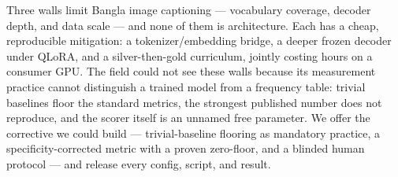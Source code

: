 \documentclass[11pt]{article}
\begin{document}
Three walls limit Bangla image captioning --- vocabulary coverage,
decoder depth, and data scale --- and none of them is architecture.
Each has a cheap, reproducible mitigation: a tokenizer/embedding
bridge, a deeper frozen decoder under QLoRA, and a silver-then-gold
curriculum, jointly costing hours on a consumer GPU. The field could
not see these walls because its measurement practice cannot
distinguish a trained model from a frequency table: trivial baselines
floor the standard metrics, the strongest published number does not
reproduce, and the scorer itself is an unnamed free parameter. We
offer the corrective we could build --- trivial-baseline flooring as
mandatory practice, a specificity-corrected metric with a proven
zero-floor, and a blinded human protocol --- and release every
config, script, and result.
\end{document}
